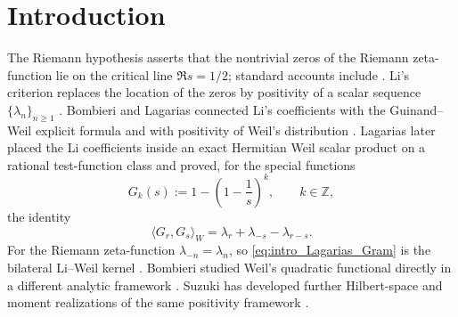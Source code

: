 \documentclass[11pt]{amsart}
\numberwithin{equation}{section}
\theoremstyle{plain}
\theoremstyle{definition}
\theoremstyle{remark}
\begin{document}
\maketitle
\clearpage
\renewcommand{\contentsname}{Table of Contents}
\tableofcontents
\clearpage

\section{Introduction}
\label{sec:introduction}

The Riemann hypothesis asserts that the nontrivial zeros of the Riemann zeta-function lie on the critical line $\Re s=1/2$; standard accounts include \cite{Riemann1859,Edwards1974,Titchmarsh1986,Conrey2003,Bombieri2010}. Li's criterion replaces the location of the zeros by positivity of a scalar sequence $\{\lambda_n\}_{n\ge1}$ \cite{Li1997}. Bombieri and Lagarias connected Li's coefficients with the Guinand--Weil explicit formula and with positivity of Weil's distribution \cite{Weil1952,BombieriLagarias1999}. Lagarias later placed the Li coefficients inside an exact Hermitian Weil scalar product on a rational test-function class and proved, for the special functions
\begin{equation}
G_k(s):=1-\left(1-\frac1s\right)^k,
\qquad k\in\mathbb Z,
\label{eq:intro_Lagarias_test}
\end{equation}
the identity
\begin{equation}
\langle G_r,G_s\rangle_W
=\lambda_r+\lambda_{-s}-\lambda_{r-s}.
\label{eq:intro_Lagarias_Gram}
\end{equation}
For the Riemann zeta-function $\lambda_{-n}=\lambda_n$, so \eqref{eq:intro_Lagarias_Gram} is the bilateral Li--Weil kernel \cite[Theorem~3.1]{Lagarias2007}. Bombieri studied Weil's quadratic functional directly in a different analytic framework \cite{Bombieri2000}. Suzuki has developed further Hilbert-space and moment realizations of the same positivity framework \cite{Suzuki2023Norms,Suzuki2023Screw,Suzuki2025Hilbert}.
\end{document}
